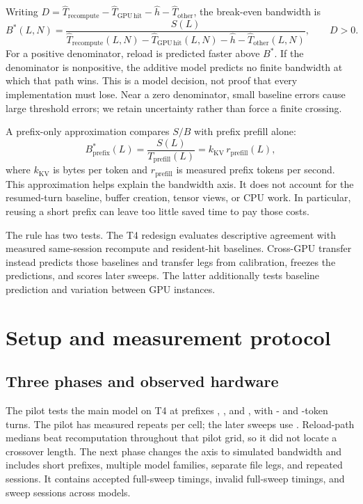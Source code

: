 \documentclass[10pt]{article}
\begin{document}
Writing $D=\widehat T_{\mathrm{recompute}}-\widehat T_{\mathrm{GPU\,hit}}-\widehat h-\widehat T_{\mathrm{other}}$, the break-even bandwidth is
\begin{equation}
 B^*(L,N)=\frac{S(L)}{
 \widehat T_{\mathrm{recompute}}(L,N)-\widehat T_{\mathrm{GPU\,hit}}(L,N)
 -\widehat h-\widehat T_{\mathrm{other}}(L,N)},\qquad D>0.
 \label{eq:bstar}
\end{equation}
For a positive denominator, reload is predicted faster above $B^*$. If the denominator is nonpositive, the additive model predicts no finite bandwidth at which that path wins. This is a model decision, not proof that every implementation must lose. Near a zero denominator, small baseline errors cause large threshold errors; we retain uncertainty rather than force a finite crossing.

A prefix-only approximation compares $S/B$ with prefix prefill alone:
\begin{equation}
 B^*_{\mathrm{prefix}}(L)
 =\frac{S(L)}{T_{\mathrm{prefill}}(L)}
 = k_{\mathrm{KV}}\,r_{\mathrm{prefill}}(L),
 \label{eq:prefix}
\end{equation}
where $k_{\mathrm{KV}}$ is bytes per token and $r_{\mathrm{prefill}}$ is measured prefix tokens per second. This approximation helps explain the bandwidth axis. It does not account for the resumed-turn baseline, buffer creation, tensor views, or CPU work. In particular, reusing a short prefix can leave too little saved time to pay those costs.

The rule has two tests. The T4 redesign evaluates descriptive agreement with measured same-session recompute and resident-hit baselines. Cross-GPU transfer instead predicts those baselines and transfer legs from calibration, freezes the predictions, and scores later sweeps. The latter additionally tests baseline prediction and variation between GPU instances.

\section{Setup and measurement protocol}\label{sec:setup}
\subsection{Three phases and observed hardware}
The pilot tests the main model on T4 at prefixes , , and , with - and -token turns. The pilot has  measured repeats per cell; the later sweeps use . Reload-path medians beat recomputation throughout that pilot grid, so it did not locate a crossover length. The next phase changes the axis to simulated bandwidth and includes short prefixes, multiple model families, separate file legs, and repeated sessions. It contains  accepted full-sweep timings,  invalid full-sweep timings, and  sweep sessions across  models.
\end{document}
